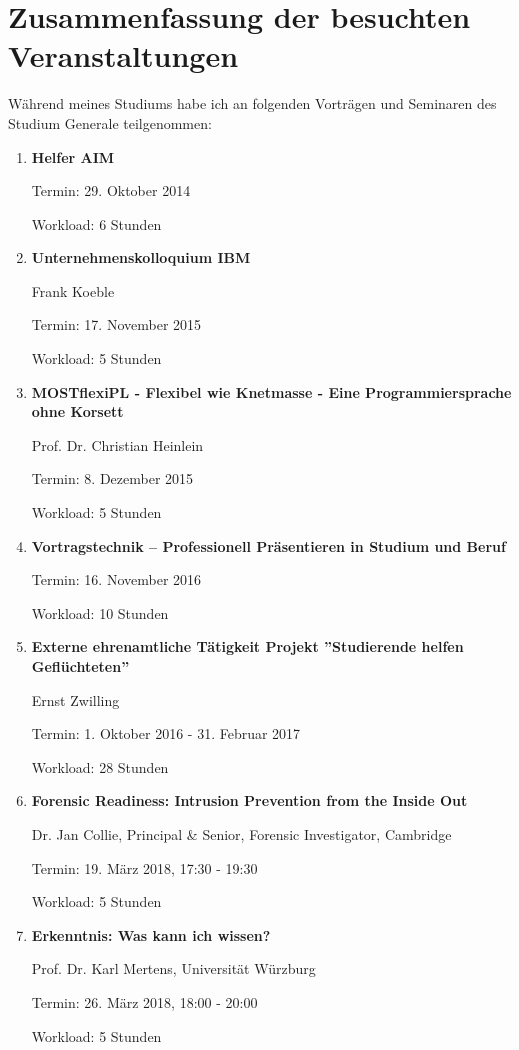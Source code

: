 \documentclass[a4paper, 12pt]{scrartcl} %
\begin{document}
\section{Zusammenfassung der besuchten Veranstaltungen}
\vspace{0.3cm}
Während meines Studiums habe ich an folgenden Vorträgen und Seminaren des Studium Generale
teilgenommen:
\vspace{0.7cm}
\begin{enumerate}
\item\textbf{Helfer AIM} \par
Termin: 29. Oktober 2014 \par
Workload: 6 Stunden
\item\textbf{Unternehmenskolloquium IBM} \par
Frank Koeble \par
Termin: 17. November 2015 \par
Workload: 5 Stunden
\item\textbf{MOSTflexiPL - Flexibel wie Knetmasse - Eine Programmiersprache ohne Korsett} \par
Prof. Dr. Christian Heinlein \par
Termin: 8. Dezember 2015 \par
Workload: 5 Stunden
\item\textbf{Vortragstechnik – Professionell Präsentieren in Studium und Beruf} \par
Termin: 16. November 2016 \par
Workload: 10 Stunden
\item\textbf{Externe ehrenamtliche Tätigkeit Projekt ''Studierende helfen Geflüchteten''} \par
Ernst Zwilling \par
Termin: 1. Oktober 2016 - 31. Februar 2017 \par
Workload: 28 Stunden
\item\textbf{Forensic Readiness: Intrusion Prevention from the Inside Out} \par
Dr. Jan Collie, Principal \& Senior, Forensic Investigator, Cambridge \par
Termin: 19. März 2018, 17:30 - 19:30 \par
Workload: 5 Stunden
\item\textbf{Erkenntnis: Was kann ich wissen?} \par
Prof. Dr. Karl Mertens, Universität Würzburg \par
Termin: 26. März 2018, 18:00 - 20:00  \par
Workload: 5 Stunden

\end{enumerate}
\end{document}
